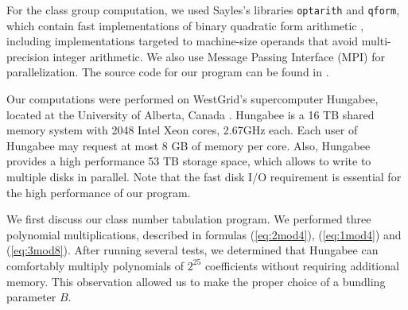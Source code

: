 \documentclass{mcom-l}
\theoremstyle{definition}
\begin{document}
For the class group computation, we used Sayles's libraries
\texttt{optarith} and \texttt{qform}, which contain fast
implementations of binary quadratic form arithmetic
\cite{sayles1,sayles2}, including implementations targeted to
machine-size operands that avoid multi-precision integer arithmetic.
We also use Message Passing Interface (MPI) for parallelization. The
source code for our program can be found in \cite{mosunov2}.

Our computations were performed on WestGrid's supercomputer Hungabee,
located at the University of Alberta, Canada \cite{westgrid}. Hungabee
is a 16 TB shared memory system with 2048 Intel Xeon cores, 2.67GHz
each. Each user of Hungabee may request at most 8 GB of memory per
core. Also, Hungabee provides a high performance 53 TB storage space,
which allows to write to multiple disks in parallel. Note that the
fast disk I/O requirement is essential for the high performance of our
program.

We first discuss our class number tabulation program. We performed
three polynomial multiplications, described in formulas
(\ref{eq:2mod4}), (\ref{eq:1mod4}) and (\ref{eq:3mod8}). After running
several tests, we determined that Hungabee can comfortably multiply
polynomials of $2^{25}$ coefficients without requiring additional
memory. This observation allowed us to make the proper choice of a
bundling parameter $B$. 
\end{document}
